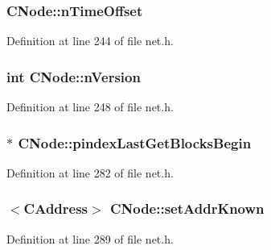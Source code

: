 \hypertarget{class_c_node_a3079fadef397abbf7e8d444f4426ebe7}{}
\subsubsection[{n\+Time\+Offset}]{ C\+Node\+::n\+Time\+Offset}\label{class_c_node_a3079fadef397abbf7e8d444f4426ebe7}


Definition at line 244 of file net.\+h.

\hypertarget{class_c_node_a99173eb3cef17e699ba21a5249ac33d2}{}
\subsubsection[{n\+Version}]{\setlength{\rightskip}{0pt plus 5cm}int C\+Node\+::n\+Version}\label{class_c_node_a99173eb3cef17e699ba21a5249ac33d2}


Definition at line 248 of file net.\+h.

\hypertarget{class_c_node_ac655c80f7fbef266417985776043785b}{}
\subsubsection[{pindex\+Last\+Get\+Blocks\+Begin}]{$\ast$ C\+Node\+::pindex\+Last\+Get\+Blocks\+Begin}\label{class_c_node_ac655c80f7fbef266417985776043785b}


Definition at line 282 of file net.\+h.

\hypertarget{class_c_node_ac21266ce880bd36b98ba7cfcc447a30f}{}
\subsubsection[{set\+Addr\+Known}]{$<${\bf C\+Address}$>$ C\+Node\+::set\+Addr\+Known}\label{class_c_node_ac21266ce880bd36b98ba7cfcc447a30f}


Definition at line 289 of file net.\+h.


